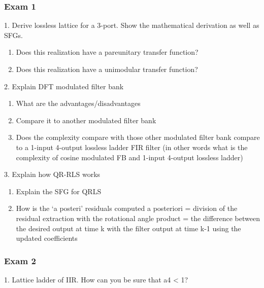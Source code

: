 \documentclass[
  a4paper,
  ,captions=tableheading
]{scrartcl}
\providecommand{\tightlist}{%
  \setlength{\itemsep}{0pt}\setlength{\parskip}{0pt}}
\begin{document}
\subsubsection{Exam 1}\label{exam-1}

1. Derive lossless lattice for a 3-port. Show the mathematical
derivation as well as SFGs.

\begin{enumerate}
\def\labelenumi{\arabic{enumi}.}
\tightlist
\item
  Does this realization have a pareunitary transfer function?\\
\item
  Does this realization have a unimodular transfer function?
\end{enumerate}

2. Explain DFT modulated filter bank

\begin{enumerate}
\def\labelenumi{\arabic{enumi}.}
\tightlist
\item
  What are the advantages/disadvantages\\
\item
  Compare it to another modulated filter bank\\
\item
  Does the complexity compare with those other modulated filter bank
  compare to a 1-input 4-output lossless ladder FIR filter (in other
  words what is the complexity of cosine modulated FB and 1-input
  4-output lossless ladder)
\end{enumerate}

3. Explain how QR-RLS works

\begin{enumerate}
\def\labelenumi{\arabic{enumi}.}
\tightlist
\item
  Explain the SFG for QRLS\\
\item
  How is the `a posteri' residuals computed a posteriori = division of
  the residual extraction with the rotational angle product = the
  difference between the desired output at time k with the filter output
  at time k-1 using the updated coefficients
\end{enumerate}

\subsubsection{Exam 2}\label{exam-2}

1. Lattice ladder of IIR. How can you be sure that \textbar a4\textbar{}
\textless{} 1?
\end{document}

